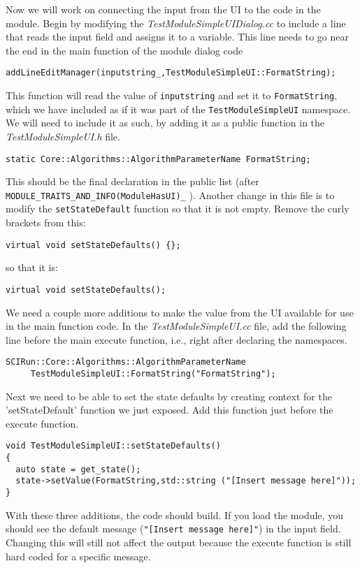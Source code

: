 \documentclass[fleqn,11pt,openany]{book}
\begin{document}
Now we will work on connecting the input from the UI to the code in the module.  
Begin by modifying the \emph{TestModuleSimpleUIDialog.cc} to include a line that reads the input field and assigns it to a variable. 
This line needs to go near the end in the main function of the module dialog code
\begin{verbatim}
addLineEditManager(inputstring_,TestModuleSimpleUI::FormatString);
\end{verbatim}
This function will read the value of \verb|inputstring| and set it to \verb|FormatString|, which we have included as if it was part of the \verb|TestModuleSimpleUI| namespace.  
We will need to include it as such, by adding it as a public function in the \emph{TestModuleSimpleUI.h} file.
\begin{verbatim}
static Core::Algorithms::AlgorithmParameterName FormatString;
\end{verbatim}
This should be the final declaration in the public list (after \verb|MODULE_TRAITS_AND_INFO(ModuleHasUI)_| ).
Another change in this file is to modify the \verb|setStateDefault| function so that it is not empty.  
Remove the curly brackets from this:
\begin{verbatim}
virtual void setStateDefaults() {};
\end{verbatim}
so that it is:
\begin{verbatim}
virtual void setStateDefaults();
\end{verbatim}
We need a couple more additions to make the value from the UI available for use in the main function code.  
In the \emph{TestModuleSimpleUI.cc} file, add the following line before the main execute function, i.e., right after declaring the namespaces.
\begin{verbatim}
SCIRun::Core::Algorithms::AlgorithmParameterName 
   	 TestModuleSimpleUI::FormatString("FormatString");
\end{verbatim}

Next we need to be able to set the state defaults by creating context for the 'setStateDefault' function we just exposed.
Add this function just before the execute function.
\begin{verbatim}
void TestModuleSimpleUI::setStateDefaults()
{
  auto state = get_state();
  state->setValue(FormatString,std::string ("[Insert message here]"));
}
\end{verbatim}
With these three additions, the code should build.
If you load the module, you should see the default message (\verb|"[Insert message here]"|) in the input field.  
Changing this will still not affect the output because the execute function is still hard coded for a specific message.  
\end{document}

